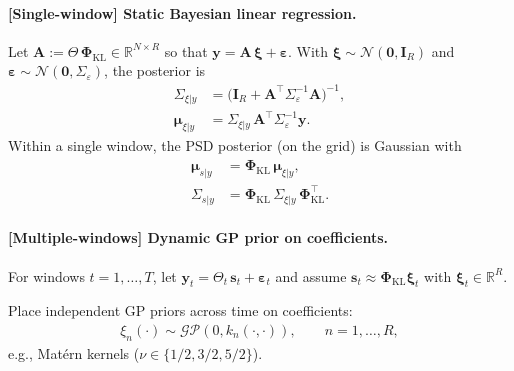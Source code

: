 \documentclass[11pt,a4paper]{report}
\theoremstyle{definition}
\providecommand{\ve}[1]{{\boldsymbol{#1}}}
\providecommand{\mat}[1]{{\pmb{#1}}}
\begin{document}
\paragraph{[Single-window] Static Bayesian linear regression.}
Let $\mathbf{A} {:=} \boldsymbol{\varTheta}\,\boldsymbol{\Phi}_{\!\mathrm{KL}} {\in} \mathbb{R}^{N\times R}$ so that $\ve{y} {=} \mat{A}\,\boldsymbol{\xi} {+} \boldsymbol{\varepsilon}$.
With $\boldsymbol{\xi} {\sim} \mathcal{N}(\ve{0}, \mat{I}_R)$ and $\boldsymbol{\varepsilon}{\sim} \mathcal{N}(\mathbf{0},\boldsymbol{ \varSigma}_\varepsilon)$, the posterior is
\begin{subequations}
\begin{align}
	\boldsymbol{ \varSigma}_{\xi|y} &= \Big(\mat{I}_R + \mat{A}^\top \boldsymbol{ \varSigma}_\varepsilon^{-1} \mat{A}\Big)^{-1}, \\
	\boldsymbol{\mu}_{\xi|y} &= \boldsymbol{ \varSigma}_{\xi|y}\,\mat{A}^\top \boldsymbol{ \varSigma}_\varepsilon^{-1} \ve{y}.
\end{align}
\end{subequations}
Within a single window, the PSD posterior (on the grid) is Gaussian with
\begin{subequations}
\begin{align}
	\boldsymbol{\mu}_{s|y} &= \boldsymbol{\Phi}_{\!\mathrm{KL}} \,\boldsymbol{\mu}_{\xi|y}, \\
	\boldsymbol{ \varSigma}_{s|y} &= \boldsymbol{\Phi}_{\!\mathrm{KL}} \,\boldsymbol{ \varSigma}_{\xi|y}\, \boldsymbol{\Phi}_{\!\mathrm{KL}}^\top.
\end{align}
\end{subequations}

\paragraph{[Multiple-windows] Dynamic GP prior on coefficients.}
For windows $t{=}1,\dots,T$, let $\ve{y}_t {=} \boldsymbol{\varTheta}_t\,\ve{s}_t + \boldsymbol{\varepsilon}_t$ and assume
$\ve{s}_t {\approx} \boldsymbol{\Phi}_{\!\mathrm{KL}} \boldsymbol{\xi}_t$ with $\boldsymbol{\xi}_t {\in} \mathbb{R}^{R}$.

Place independent GP priors across time on coefficients:
\begin{align}
	\xi_n(\cdot) \sim \mathcal{GP}(0, k_n(\cdot,\cdot)), \qquad n=1,\dots,R,
\end{align}
e.g., Matérn kernels ($\nu \in \{1/2, 3/2, 5/2\}$).
\end{document}
